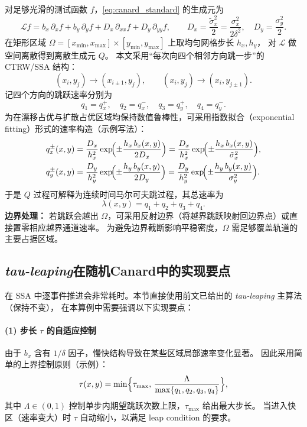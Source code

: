 	对足够光滑的测试函数 \(f\)，\eqref{eq:canard_standard} 的生成元为
	\begin{equation}\label{eq:canard_generator}
		\mathcal{L}f
		= b_x\,\partial_x f + b_y\,\partial_y f
		+ D_x\,\partial_{xx}f + D_y\,\partial_{yy}f,
		\qquad
		D_x=\frac{\tilde\sigma_x^2}{2}=\frac{\sigma_x^2}{2\delta^2},\quad
		D_y=\frac{\sigma_y^2}{2}.
	\end{equation}
	在矩形区域 \(\Omega=[x_{\min},x_{\max}]\times[y_{\min},y_{\max}]\) 上取均匀网格步长 \(h_x,h_y\)，
	对 \(\mathcal{L}\) 做空间离散得到离散生成元 \(Q\)。
	本文采用“每次向四个相邻方向跳一步”的 CTRW/SSA 结构：
	\[
	(x_i,y_j)\to (x_{i\pm 1},y_j),\qquad (x_i,y_j)\to(x_i,y_{j\pm 1}).
	\]
	记四个方向的跳跃速率分别为
	\[
	q_1=q_x^+,\quad q_2=q_x^-,\quad q_3=q_y^+,\quad q_4=q_y^-.
	\]
	为在漂移占优与扩散占优区域均保持数值鲁棒性，可采用指数拟合（exponential fitting）形式的速率构造（示例写法）：
	\begin{equation}\label{eq:canard_rates}
		\begin{aligned}
			q_x^\pm(x,y)
			&= \frac{D_x}{h_x^2}\exp\!\Bigl(\pm \frac{h_x\,b_x(x,y)}{2D_x}\Bigr)
			= \frac{D_x}{h_x^2}\exp\!\Bigl(\pm \frac{h_x\,b_x(x,y)}{\tilde\sigma_x^2}\Bigr),\\
			q_y^\pm(x,y)
			&= \frac{D_y}{h_y^2}\exp\!\Bigl(\pm \frac{h_y\,b_y(x,y)}{2D_y}\Bigr)
			= \frac{D_y}{h_y^2}\exp\!\Bigl(\pm \frac{h_y\,b_y(x,y)}{\sigma_y^2}\Bigr).
		\end{aligned}
	\end{equation}
	于是 \(Q\) 过程可解释为连续时间马尔可夫跳过程，其总速率为
	\[
	\lambda(x,y)=q_1+q_2+q_3+q_4.
	\]
	\textbf{边界处理：} 若跳跃会越出 \(\Omega\)，可采用反射边界（将越界跳跃映射回边界点）或直接置零相应越界通道速率。
	为避免边界截断影响平稳密度，\(\Omega\) 需足够覆盖轨道的主要占据区域。
	
	\subsection{\textit{tau-leaping}在随机Canard中的实现要点}
	
	在 SSA 中逐事件推进会非常耗时。本节直接使用前文已给出的 \textit{tau-leaping} 主算法（保持不变），
	在本算例中需要强调以下实现要点：
	
	\paragraph{(1) 步长 \(\tau\) 的自适应控制}
	由于 \(b_x\) 含有 \(1/\delta\) 因子，慢快结构导致在某些区域局部速率变化显著。
	因此采用简单的上界控制原则（示例）：
	\begin{equation}\label{eq:tau_choice}
		\tau(x,y)=\min\Bigl\{\tau_{\max},\, \frac{\Lambda}{\max\{q_1,q_2,q_3,q_4\}}\Bigr\},
	\end{equation}
	其中 \(\Lambda\in(0,1)\) 控制单步内期望跳跃次数上限，\(\tau_{\max}\) 给出最大步长。
	当进入快区（速率变大）时 \(\tau\) 自动缩小，以满足 leap condition 的要求。
	
